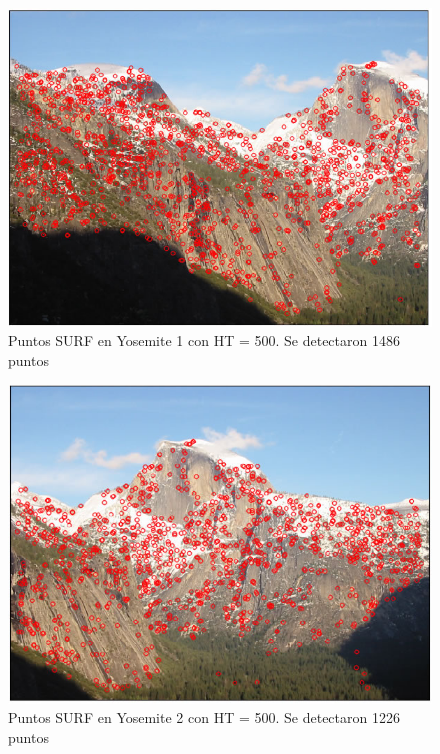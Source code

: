 \documentclass[12pt,spanish]{article} %
\begin{document}
\begin{figure}[H]
  \begin{center}
  \includegraphics[scale=.6]{ej1_surf1_ht500}
  \caption{Puntos SURF en Yosemite 1 con HT = 500. Se detectaron 1486 puntos}
  \label{fig:ej1_surf1_ht500}
  \end{center}
\end{figure}

\begin{figure}[H]
  \begin{center}
  \includegraphics[scale=.6]{ej1_surf2_ht500}
  \caption{Puntos SURF en Yosemite 2 con HT = 500. Se detectaron 1226 puntos}
  \label{fig:ej1_surf2_ht500}
  \end{center}
\end{figure}
\end{document}
